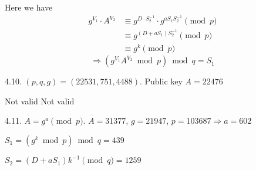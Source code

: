 	Here we have
	\begin{align*}
		g^{V_1} \cdot A^{V_2} & \equiv g^{D \cdot S_2^{-1}} \cdot g^{aS_1 S_2^{-1}} \pmod p \\ & \equiv g^{(D+aS_1)S_2^{-1}} \pmod p \\ & \equiv g^k \pmod p
	\end{align*}
	$$\Rightarrow (g^{V_1} A^{V_2} \bmod p) \bmod q = S_1$$


4.10. $(p, q, g) = (22531, 751, 4488)$. Public key $A = 22476$
	
		 Not valid
		 Not valid
	


4.11. $A = g^a \pmod p$. $A = 31377$, $g = 21947$, $p = 103687 \Rightarrow a = 602$
	
	$S_1 = (g^k \bmod p) \bmod q = 439$
	
	$S_2 = (D + aS_1)k^{-1} \pmod q = 1259$
